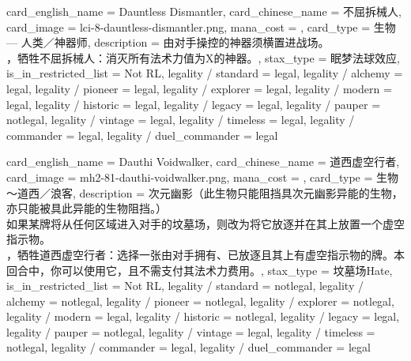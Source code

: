 \documentclass[lang = cn, color = black, 10pt]{AllThatStax}
\begin{document}
\card
{
	card_english_name = {Dauntless Dismantler},
	card_chinese_name = {不屈拆械人},
	card_image = lci-8-dauntless-dismantler.png,
	mana_cost = ,
	card_type = 生物 — 人类／神器师,
	description = {由对手操控的神器须横置进战场。\\
		，牺牲不屈拆械人：消灭所有法术力值为X的神器。},
	stax_type = 眠梦法球效应,
	is_in_restricted_list = Not RL,
	legality / standard = legal,
	legality / alchemy = legal,
	legality / pioneer = legal,
	legality / explorer = legal,
	legality / modern = legal,
	legality / historic = legal,
	legality / legacy = legal,
	legality / pauper = notlegal,
	legality / vintage = legal,
	legality / timeless = legal,
	legality / commander = legal,
	legality / duel_commander = legal
}

\card
{
	card_english_name = {Dauthi Voidwalker},
	card_chinese_name = {道西虚空行者},
	card_image = mh2-81-dauthi-voidwalker.png,
	mana_cost = ,
	card_type = 生物 ～道西／浪客,
	description = {次元幽影（此生物只能阻挡具次元幽影异能的生物，亦只能被具此异能的生物阻挡。）\\
		如果某牌将从任何区域进入对手的坟墓场，则改为将它放逐并在其上放置一个虚空指示物。\\
		，牺牲道西虚空行者：选择一张由对手拥有、已放逐且其上有虚空指示物的牌。本回合中，你可以使用它，且不需支付其法术力费用。},
	stax_type = 坟墓场Hate,
	is_in_restricted_list = Not RL,
	legality / standard = notlegal,
	legality / alchemy = notlegal,
	legality / pioneer = notlegal,
	legality / explorer = notlegal,
	legality / modern = legal,
	legality / historic = notlegal,
	legality / legacy = legal,
	legality / pauper = notlegal,
	legality / vintage = legal,
	legality / timeless = notlegal,
	legality / commander = legal,
	legality / duel_commander = legal
}
\end{document}
